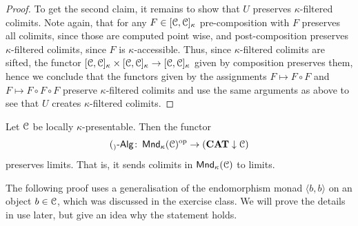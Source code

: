 \documentclass[a4paper,11pt,oneside,openany]{scrbook}
\begin{document}
\begin{proof}
	To get the second claim, it remains to show that $U$ preserves
    $\kappa$-filtered colimits. Note again, that for any $F \in
    [\operatorname{\mathcal{C}},\operatorname{\mathcal{C}}]_{\kappa}$ pre-composition with $F$ preserves all colimits, since
    those are computed point wise, and post-composition preserves
    $\kappa$-filtered colimits, since $F$ is $\kappa$-accessible.  Thus, since
    $\kappa$-filtered colimits are sifted, the functor $[\operatorname{\mathcal{C}},\operatorname{\mathcal{C}}]_{\kappa} \times
    [\operatorname{\mathcal{C}},\operatorname{\mathcal{C}}]_{\kappa} \to [\operatorname{\mathcal{C}},\operatorname{\mathcal{C}}]_{\kappa}$ given by composition preserves them,
    hence we conclude that the functors given by the assignments $F \mapsto F
    \circ F$ and $F \mapsto F \circ F \circ F$ preserve $\kappa$-filtered
    colimits and use the same arguments as above to see that $U$ creates
    $\kappa$-filtered colimits.
\end{proof}

\begin{prop}
	Let $\operatorname{\mathcal{C}}$ be locally $\kappa$-presentable. Then the functor
	\begin{equation*}
		(_)\operatorname{-\mathsf{Alg}} \colon \operatorname{\mathsf{Mnd}}_{\kappa}(\operatorname{\mathcal{C}})^{\operatorname{\text{op}}} \to ({\normalfont\textbf{CAT}} \downarrow \operatorname{\mathcal{C}})
	\end{equation*}
	preserves limits. That is, it sends colimits in $\operatorname{\mathsf{Mnd}}_{\kappa}(\operatorname{\mathcal{C}})$ to limits.
\end{prop}

The following proof uses a generalisation of the endomorphism monad $\langle
b,b\rangle$ on an object $b \in \operatorname{\mathcal{C}}$, which was discussed in the exercise class.
We will prove the details in use later, but give an idea why the statement
holds.
\end{document}

